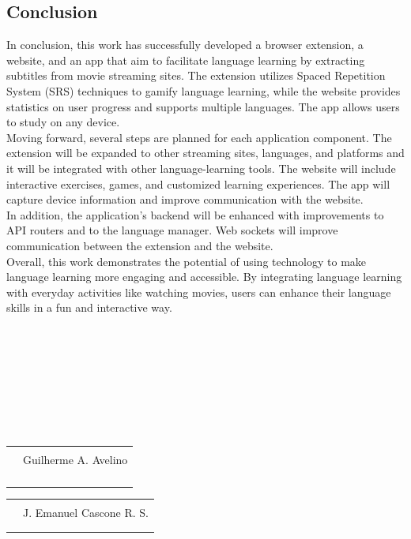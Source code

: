 \documentclass[12pt]{article}
\begin{document}
\subsection{Conclusion}
In conclusion, this work has successfully developed a browser extension, a website, and an app that aim to facilitate language learning by extracting subtitles from movie streaming sites. The extension utilizes Spaced Repetition System (SRS) techniques to gamify language learning, while the website provides statistics on user progress and supports multiple languages. The app allows users to study on any device. \\
Moving forward, several steps are planned for each application component. The extension will be expanded to other streaming sites, languages, and platforms and it will be integrated with other language-learning tools. The website will include interactive exercises, games, and customized learning experiences. The app will capture device information and improve communication with the website. \\
In addition, the application's backend will be enhanced with improvements to API routers and to the language manager. Web sockets will improve communication between the extension and the website. \\
Overall, this work demonstrates the potential of using technology to make language learning more engaging and accessible. By integrating language learning with everyday activities like watching movies, users can enhance their language skills in a fun and interactive way.




\hfill \\
\hfill \\
\hfill \\
\hfill \\
\hfill \\
\hfill \\
\hfill \\
\hfill 
\centering

\begin{tabular}{@{}p{.5in}p{4in}@{}}
& \hrulefill \\
& \centerline{Guilherme A. Avelino} \\
\\ \\ \\ \\ 
\end{tabular}

\centering
\begin{tabular}{@{}p{.5in}p{4in}@{}}
& \hrulefill \\
& \centerline{J. Emanuel Cascone R. S.} \\
\\ \\
\end{tabular}
\end{document}
